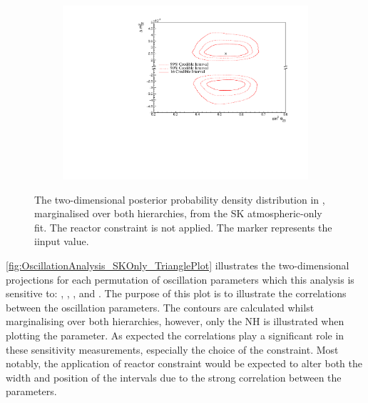 \begin{figure}[h]
  \begin{subfigure}[t]{0.96\textwidth}
    \includegraphics[width=\textwidth, trim={0mm 0mm 0mm 0mm}, clip,page=1]{Figures/OA/SKOnlyFit/Contours_2D_th23_dm32_BH_0_woRC_UnSmeared_CredibleInterval.pdf}
  \end{subfigure}
  \caption{The two-dimensional posterior probability density distribution in , marginalised over both hierarchies, from the SK atmospheric-only fit. The reactor constraint is not applied. The marker represents the iinput value.}
  \label{fig:OscillationAnalysis_SKOnly_DM32TH23}
\end{figure}

\clearpage

\autoref{fig:OscillationAnalysis_SKOnly_TrianglePlot} illustrates the two-dimensional projections for each permutation of oscillation parameters which this analysis is sensitive to: , , , and . The purpose of this plot is to illustrate the correlations between the oscillation parameters. The contours are calculated whilst marginalising over both hierarchies, however, only the NH is illustrated when plotting the  parameter. As expected the correlations play a significant role in these sensitivity measurements, especially the choice of the  constraint. Most notably, the application of reactor constraint would be expected to alter both the width and position of the  intervals due to the strong correlation between the parameters.

